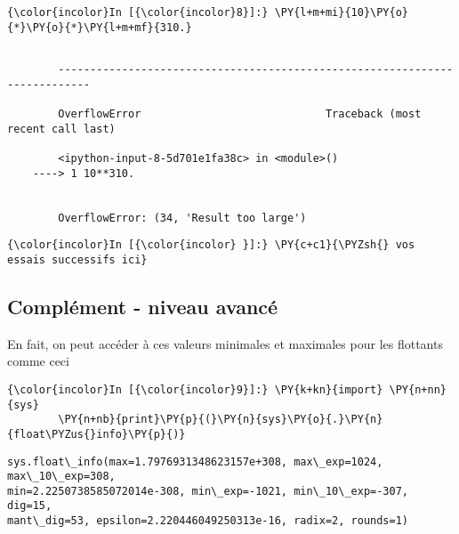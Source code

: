     \begin{Verbatim}[commandchars=\\\{\}]
{\color{incolor}In [{\color{incolor}8}]:} \PY{l+m+mi}{10}\PY{o}{*}\PY{o}{*}\PY{l+m+mf}{310.}
\end{Verbatim}


    \begin{Verbatim}[commandchars=\\\{\}]

        ---------------------------------------------------------------------------

        OverflowError                             Traceback (most recent call last)

        <ipython-input-8-5d701e1fa38c> in <module>()
    ----> 1 10**310.
    

        OverflowError: (34, 'Result too large')

    \end{Verbatim}

    \begin{Verbatim}[commandchars=\\\{\}]
{\color{incolor}In [{\color{incolor} }]:} \PY{c+c1}{\PYZsh{} vos essais successifs ici}
\end{Verbatim}


    \hypertarget{compluxe9ment---niveau-avancuxe9}{%
\subsection{Complément - niveau
avancé}\label{compluxe9ment---niveau-avancuxe9}}

    En fait, on peut accéder à ces valeurs minimales et maximales pour les
flottants comme ceci

    \begin{Verbatim}[commandchars=\\\{\}]
{\color{incolor}In [{\color{incolor}9}]:} \PY{k+kn}{import} \PY{n+nn}{sys}
        \PY{n+nb}{print}\PY{p}{(}\PY{n}{sys}\PY{o}{.}\PY{n}{float\PYZus{}info}\PY{p}{)}
\end{Verbatim}


    \begin{Verbatim}[commandchars=\\\{\}]
sys.float\_info(max=1.7976931348623157e+308, max\_exp=1024, max\_10\_exp=308,
min=2.2250738585072014e-308, min\_exp=-1021, min\_10\_exp=-307, dig=15,
mant\_dig=53, epsilon=2.220446049250313e-16, radix=2, rounds=1)

    \end{Verbatim}

